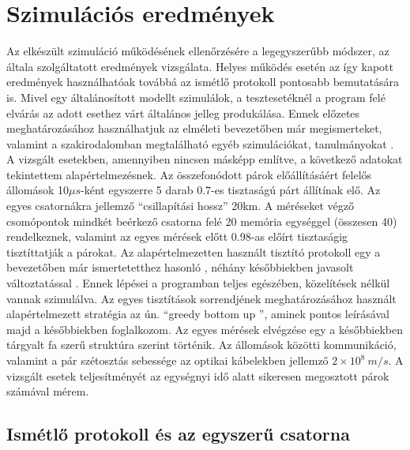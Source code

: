 \chapter{Szimulációs eredmények}

Az elkészült szimuláció működésének ellenőrzésére a legegyszerűbb módszer, az általa szolgáltatott eredmények vizsgálata. Helyes működés esetén az így kapott eredmények használhatóak továbbá az ismétlő protokoll pontosabb bemutatására is. Mivel egy általánosított modellt szimulálok, a tesztesetéknél a program felé elvárás az adott esethez várt általános jelleg produkálása. Ennek előzetes meghatározásához használhatjuk az elméleti bevezetőben már megismerteket, valamint  a szakirodalomban megtalálható egyéb szimulációkat, tanulmányokat \cite{briegel1998quantum}\cite{van2009system}\cite{bernardes2011rate}. A vizsgált esetekben, amennyiben nincsen másképp említve, a következő adatokat tekintettem alapértelmezésnek. 
Az összefonódott párok előállításáért felelős állomások 10$\mu s$-ként egyszerre 5 darab 0.7-es tisztaságú párt állítínak elő. Az egyes csatornákra jellemző ``csillapítási hossz'' 20km. A méréseket végző csomópontok mindkét beérkező csatorna felé 20 memória egységgel (összesen 40) rendelkeznek, valamint az egyes mérések előtt 0.98-as előírt tisztaságig tisztíttatják a párokat. Az alapértelmezetten használt tisztító protokoll egy a bevezetőben már ismertetetthez hasonló \cite{deutsch1996quantum}, néhány későbbiekben javasolt változtatással \cite{briegel1998quantum}. Ennek lépései a programban teljes egészében, közelítések nélkül vannak szimulálva. Az egyes tisztítások sorrendjének meghatározásához használt alapértelmezett stratégia az ún. ``greedy bottom up '', aminek pontos leírásával majd a későbbiekben foglalkozom. Az egyes mérések elvégzése egy a későbbiekben tárgyalt fa szerű struktúra szerint történik. Az állomások közötti kommunikáció, valamint a pár szétosztás sebessége az optikai kábelekben jellemző $2 \times 10^8 \ m/s$. A vizsgált esetek teljesítményét az egységnyi idő alatt sikeresen megosztott párok számával mérem.

\section{Ismétlő protokoll és az egyszerű csatorna}

